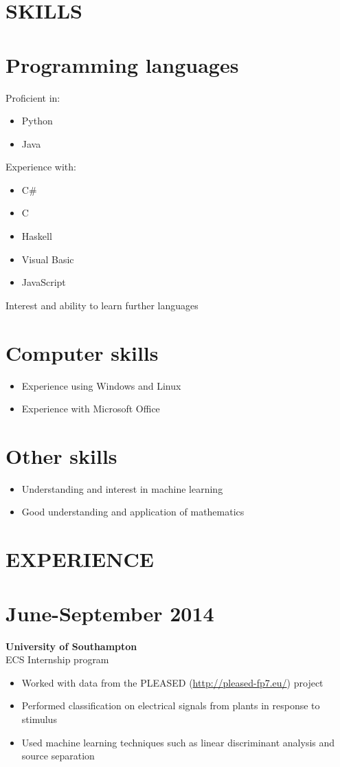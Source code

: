 \documentclass[margin]{res}
\begin{document}
\begin{resume}
\section{SKILLS}

\normalsize{\section{Programming languages}}
Proficient in:
\begin{itemize}
\item Python
\item Java
\end{itemize}
Experience with:
\begin{itemize}
\item C\#
\item C
\item Haskell
\item Visual Basic
\item JavaScript
\end{itemize}
Interest and ability to learn further languages

\normalsize{\section{Computer skills}}
\begin{itemize}
\item Experience using Windows and Linux
\item Experience with Microsoft Office
\end{itemize}

\normalsize{\section{Other skills}}
\begin{itemize}
\item Understanding and interest in machine learning
\item Good understanding and application of mathematics
\end{itemize}

\section{EXPERIENCE}

\normalsize{\section{June-September 2014}}
{\bf University of Southampton} \\
ECS Internship program \\
\begin{itemize}
\item 
Worked with data from the PLEASED
(\href{http://pleased-fp7.eu/}{http://pleased-fp7.eu/}) project
\item 
Performed classification on electrical signals from plants in response to
stimulus
\item 
Used machine learning techniques such as linear discriminant analysis and
source separation
\end{itemize}


\end{resume}
\end{document}
